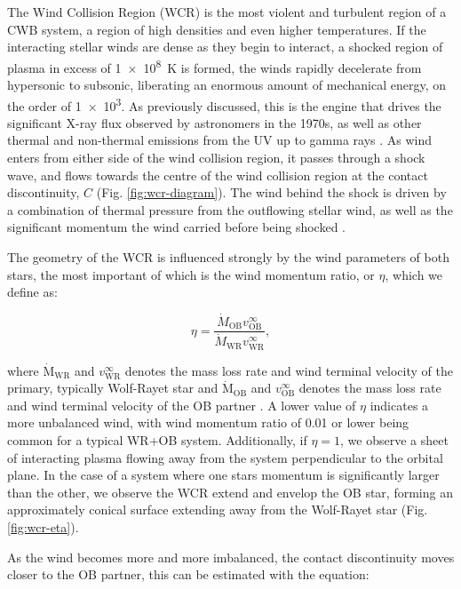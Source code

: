 The Wind Collision Region (WCR) is the most violent and turbulent region of a CWB system, a region of high densities and even higher temperatures.
If the interacting stellar winds are dense as they begin to interact, a shocked region of plasma in excess of \SI{1e8}{\kelvin} is formed, the winds rapidly decelerate from hypersonic to subsonic, liberating an enormous amount of mechanical energy, on the order of \SI{1e3}{\solarluminosity}.
As previously discussed, this is the engine that drives the significant X-ray flux observed by astronomers in the 1970s, as well as other thermal and non-thermal emissions from the UV up to gamma rays \parencite{eichler_particle_1993,grimaldoProtonAccelerationColliding2019}.
As wind enters from either side of the wind collision region, it passes through a shock wave, and flows towards the centre of the wind collision region at the contact discontinuity, $C$ (Fig. \ref{fig:wcr-diagram}).
The wind behind the shock is driven by a combination of thermal pressure from the outflowing stellar wind, as well as the significant momentum the wind carried before being shocked \parencite{stevens_colliding_1992}.

The geometry of the WCR is influenced strongly by the wind parameters of both stars, the most important of which is the wind momentum ratio, or $\eta$, which we define as:

\begin{equation}
  \eta = \frac{\dot M_\text{OB} v^\infty_\text{OB}}{\dot M_\text{WR} v^\infty_\text{WR}},
\end{equation}

\noindent
where $\dot{\text{M}}_\text{WR}$ and $v^{\infty}_\text{WR}$ denotes the mass loss rate and wind terminal velocity of the primary, typically Wolf-Rayet star and $\dot{\text{M}}_\text{OB}$ and $v^{\infty}_\text{OB}$ denotes the mass loss rate and wind terminal velocity of the OB partner \parencite{usov_stellar_1991}.
A lower value of $\eta$ indicates a more unbalanced wind, with wind momentum ratio of \num{0.01} or lower being common for a typical WR+OB system.
Additionally, if $\eta = 1$, we observe a sheet of interacting plasma flowing away from the system perpendicular to the orbital plane.
In the case of a system where one stars momentum is significantly larger than the other, we observe the WCR extend and envelop the OB star, forming an approximately conical surface extending away from the Wolf-Rayet star (Fig. \ref{fig:wcr-eta}).


As the wind becomes more and more imbalanced, the contact discontinuity moves closer to the OB partner, this can be estimated with the equation:


